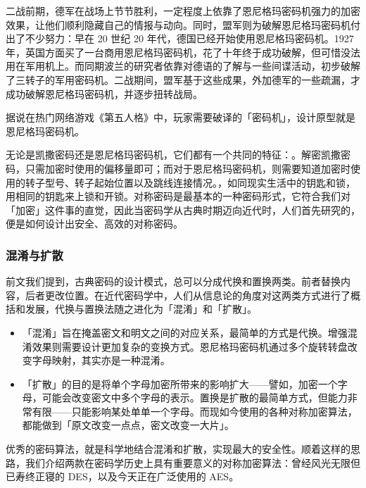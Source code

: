 二战前期，德军在战场上节节胜利，一定程度上依靠了恩尼格玛密码机强力的加密效果，让他们顺利隐藏自己的情报与动向。同时，盟军则为破解恩尼格玛密码机付出了不少努力：早在 20 世纪 20 年代，德国已经开始使用恩尼格玛密码机。1927 年，英国方面买了一台商用恩尼格玛密码机，花了十年终于成功破解，但可惜没法用在军用机上。而同期波兰的研究者依靠对德语的了解与一些间谍活动，初步破解了三转子的军用密码机。二战期间，盟军基于这些成果，外加德军的一些疏漏，才成功破解恩尼格玛密码机，并逐步扭转战局。

\begin{note}
  据说在热门网络游戏《第五人格》中，玩家需要破译的「密码机」，设计原型就是恩尼格玛密码机。
\end{note}

无论是凯撒密码还是恩尼格玛密码机，它们都有一个共同的特征：。解密凯撒密码，只需加密时使用的偏移量即可；而对于恩尼格玛密码机，则需要知道加密时使用的转子型号、转子起始位置以及跳线连接情况。，如同现实生活中的钥匙和锁，用相同的钥匙来上锁和开锁。对称密码是最基本的一种密码形式，它符合我们对「加密」这件事的直觉，因此当密码学从古典时期迈向近代时，人们首先研究的，便是如何设计出安全、高效的对称密码。

\subsubsection{混淆与扩散}

前文我们提到，古典密码的设计模式，总可以分成代换和置换两类。前者替换内容，后者更改位置。在近代密码学中，人们从信息论的角度对这两类方式进行了概括和发展，代换与置换法随之进化为「混淆」和「扩散」。

\begin{itemize}
  \item 「混淆」旨在掩盖密文和明文之间的对应关系，最简单的方式是代换。增强混淆效果则需要设计更加复杂的变换方式。恩尼格玛密码机通过多个旋转转盘改变字母映射，其实亦是一种混淆。
  \item 「扩散」的目的是将单个字母加密所带来的影响扩大——譬如，加密一个字母，可能会改变密文中多个字母的表示。置换是扩散的最简单方式，但能力非常有限——只能影响某处单单一个字母。而现如今使用的各种对称加密算法，都能做到「原文改变一点点，密文改变一大片」。
\end{itemize}

优秀的密码算法，就是科学地结合混淆和扩散，实现最大的安全性。顺着这样的思路，我们介绍两款在密码学历史上具有重要意义的对称加密算法：曾经风光无限但已寿终正寝的 DES，以及今天正在广泛使用的 AES。

